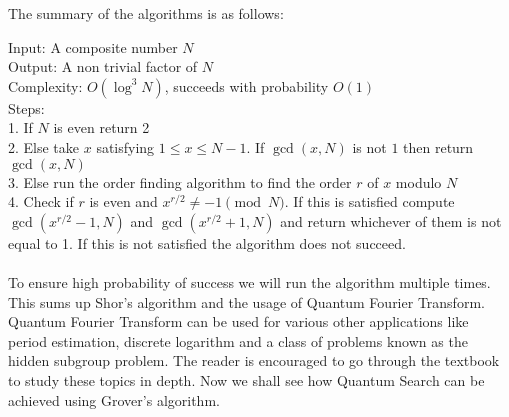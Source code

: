 The summary of the algorithms is as follows:

Input: A composite number $N$
\\
Output: A non trivial factor of $N$
\\
Complexity: $O(\log^3 N)$, succeeds with probability $O(1)$\\
Steps:
\\
1. If $N$ is even return 2\\
2. Else take $x$ satisfying $1 \leq x \leq N-1$. If $\gcd(x, N)$ is not $1$ then return $\gcd(x, N)$\\
3. Else run the order finding algorithm to find the order $r$ of $x$ modulo $N$\\
4. Check if $r$ is even and $x^{r/2} \neq -1 \pmod N$. If this is satisfied compute $\gcd(x^{r/2} - 1, N)$ and $\gcd(x^{r/2} + 1, N)$ and return whichever of them is not equal to 1. If this is not satisfied the algorithm does not succeed.
\\\\
To ensure high probability of success we will run the algorithm multiple times.
This sums up Shor's algorithm and the usage of Quantum Fourier Transform. Quantum Fourier Transform can be used for various other applications like period estimation, discrete logarithm and a class of problems known as the hidden subgroup problem. The reader is encouraged to go through the textbook to study these topics in depth. Now we shall see how Quantum Search can be achieved using Grover's algorithm.
\clearpage